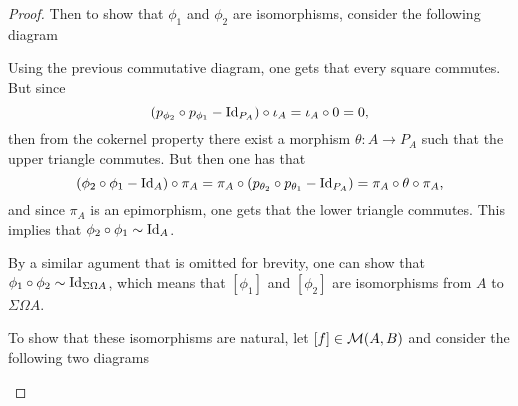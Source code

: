 \begin{proof}
    Then to show that \( \phi_1 \) and \( \phi_2 \) are isomorphisms, consider the following diagram
    \begin{center}
    \end{center}

    Using the previous commutative diagram, one gets that every square commutes. But since
    \[
        (p_{\phi_2} \circ p_{\phi_1} - \operatorname{Id}_{P_A}) \circ \iota_A = \iota_A \circ 0 = 0,
    \]
    then from the cokernel property there exist a morphism \( \theta: A \to P_A \) such that the upper triangle commutes. But then one has that
    \[
        (\phi_2 \circ \phi_1 - \operatorname{Id}_A) \circ \pi_A = \pi_A \circ (p_{\theta_2} \circ p_{\theta_1} - \operatorname{Id}_{P_A}) = \pi_A \circ \theta \circ \pi_A,
    \]
    and since \( \pi_A \) is an epimorphism, one gets that the lower triangle commutes. This implies that \( \phi_2 \circ \phi_1 \sim \operatorname{Id}_A \).
    
    By a similar agument that is omitted for brevity, one can show that \( \phi_1 \circ \phi_2 \sim \operatorname{Id}_{\Sigma\Omega A} \), which means that \( [\phi_1] \) and \( [\phi_2] \) are isomorphisms from \( A \) to \( \Sigma\Omega A \).

    To show that these isomorphisms are natural, let \( [f] \in {\mathcal{M}}(A, B) \) and consider the following two diagrams
    \begin{center}
\end{center}
\end{proof}
